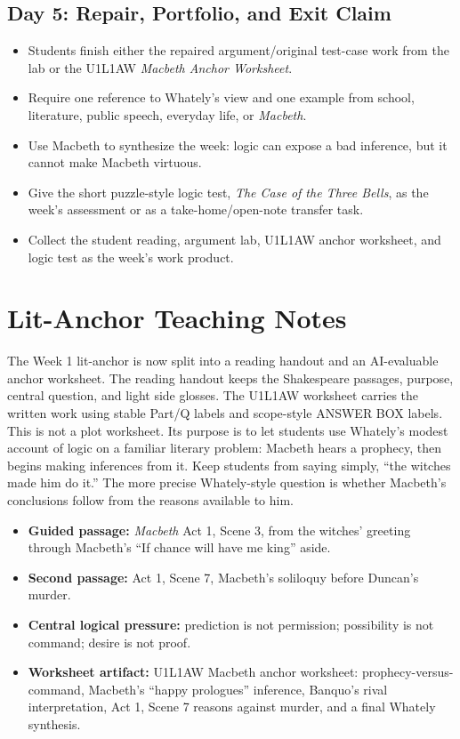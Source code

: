 \documentclass[12pt]{article}
\begin{document}
\subsection*{Day 5: Repair, Portfolio, and Exit Claim}
\begin{itemize}[leftmargin=*]
\item Students finish either the repaired argument/original test-case work from the lab or the U1L1AW \textit{Macbeth Anchor Worksheet}.
\item Require one reference to Whately's view and one example from school, literature, public speech, everyday life, or \textit{Macbeth}.
\item Use Macbeth to synthesize the week: logic can expose a bad inference, but it cannot make Macbeth virtuous.
\item Give the short puzzle-style logic test, \textit{The Case of the Three Bells}, as the week's assessment or as a take-home/open-note transfer task.
\item Collect the student reading, argument lab, U1L1AW anchor worksheet, and logic test as the week's work product.
\end{itemize}

\section*{Lit-Anchor Teaching Notes}
The Week 1 lit-anchor is now split into a reading handout and an AI-evaluable anchor worksheet. The reading handout keeps the Shakespeare passages, purpose, central question, and light side glosses. The U1L1AW worksheet carries the written work using stable Part/Q labels and scope-style ANSWER BOX labels. This is not a plot worksheet. Its purpose is to let students use Whately's modest account of logic on a familiar literary problem: Macbeth hears a prophecy, then begins making inferences from it. Keep students from saying simply, ``the witches made him do it.'' The more precise Whately-style question is whether Macbeth's conclusions follow from the reasons available to him.

\begin{itemize}[leftmargin=*]
\item \textbf{Guided passage:} \textit{Macbeth} Act 1, Scene 3, from the witches' greeting through Macbeth's ``If chance will have me king'' aside.
\item \textbf{Second passage:} Act 1, Scene 7, Macbeth's soliloquy before Duncan's murder.
\item \textbf{Central logical pressure:} prediction is not permission; possibility is not command; desire is not proof.
\item \textbf{Worksheet artifact:} U1L1AW Macbeth anchor worksheet: prophecy-versus-command, Macbeth's ``happy prologues'' inference, Banquo's rival interpretation, Act 1, Scene 7 reasons against murder, and a final Whately synthesis.
\end{itemize}
\end{document}
